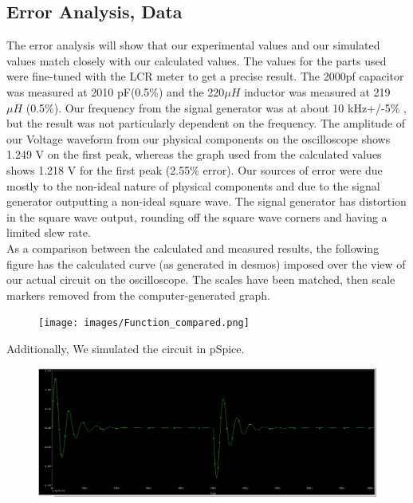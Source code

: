 \documentclass[11pt]{article}
\begin{document}
	\subsection*{Error Analysis, Data}
	The error analysis will show that our experimental values and our simulated values match closely with our calculated values. The values for the parts used were fine-tuned with the LCR meter to get a precise result. The 2000pf capacitor was measured at 2010 pF(0.5\%) and the 220$\mu H$ inductor was measured at 219 $\mu H$  (0.5\%). Our frequency from the signal generator was at about 10 kHz+/-5\% , but the result was not particularly dependent on the frequency.
	The amplitude of our Voltage waveform from our physical components on the oscilloscope shows 1.249 V on the first peak, whereas the graph used from the calculated values shows 1.218 V for the first peak (2.55\% error). 
	Our sources of error were due mostly to the non-ideal nature of physical components and due to the signal generator outputting a non-ideal square wave. The signal generator has distortion in the square wave output, rounding off the square wave corners and having a limited slew rate. \\
	
	As a comparison between the calculated and measured results, the following figure has the calculated curve (as generated in desmos) imposed over the view of our actual circuit on the oscilloscope. The scales have been matched, then scale markers removed from the computer-generated graph.
	\begin{figure}[H]
		\centering
		\texttt{[image: images/Function\_compared.png]}
	\end{figure}
	\newpage
	
	Additionally, We simulated the circuit in pSpice. 
	\begin{figure}[H]
		\centering
		\includegraphics[width=7in]{images/Orcad Graph.PNG}
	\end{figure}
	
\end{document}
